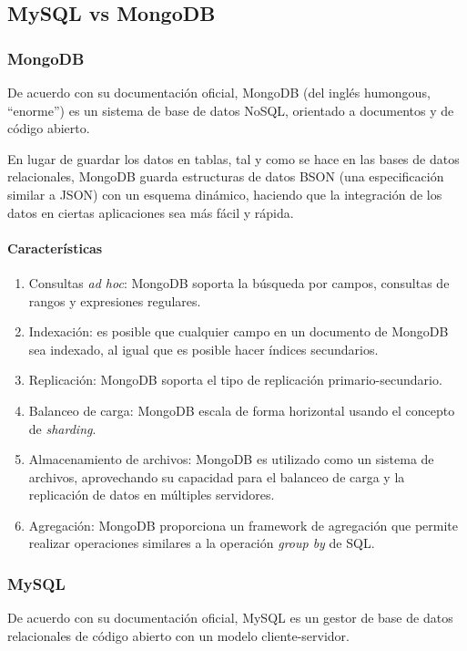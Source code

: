 \subsection{MySQL vs MongoDB}
\subsubsection*{MongoDB}
De acuerdo con su documentación oficial\cite{mongodb_mongodb_2020}, MongoDB (del inglés humongous, ``enorme'') es un sistema de base de datos NoSQL, orientado a documentos y de código abierto.


En lugar de guardar los datos en tablas, tal y como se hace en las bases de datos relacionales, MongoDB guarda estructuras de datos BSON (una especificación similar a JSON) con un esquema dinámico, haciendo que la integración de los datos en ciertas aplicaciones sea más fácil y rápida.

\paragraph*{Características}
\begin{enumerate}
    \item Consultas \textit{ad hoc}: MongoDB soporta la búsqueda por campos, consultas de rangos y expresiones regulares.
    \item Indexación: es posible que cualquier campo en un documento de MongoDB sea indexado, al igual que es posible hacer índices secundarios. 
    \item Replicación: MongoDB soporta el tipo de replicación primario-secundario. 
    \item Balanceo de carga: MongoDB escala de forma horizontal usando el concepto de \textit{sharding}.
    \item Almacenamiento de archivos: MongoDB es utilizado como un sistema de archivos, aprovechando su capacidad para el balanceo de carga y la replicación de datos en múltiples servidores. 
    \item Agregación: MongoDB proporciona un framework de agregación que permite realizar operaciones similares a la operación \textit{group by} de SQL.
\end{enumerate}


\subsubsection*{MySQL}

De acuerdo con su documentación oficial\cite{mysql_mysql_2020}, MySQL es un gestor de base de datos relacionales de código abierto con un modelo cliente-servidor.


